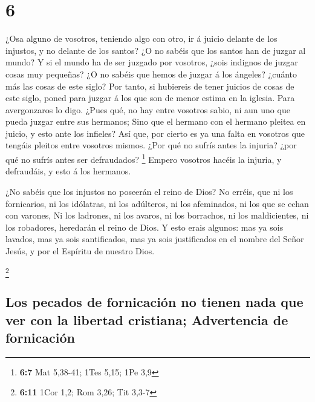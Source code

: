 \hypertarget{section-5}{%
\section{6}\label{section-5}}

 ¿Osa alguno de vosotros, teniendo algo con otro, ir á
juicio delante de los injustos, y no delante de los santos? 
¿O no sabéis que los santos han de juzgar al mundo? Y si el mundo ha de
ser juzgado por vosotros, ¿sois indignos de juzgar cosas muy pequeñas?
 ¿O no sabéis que hemos de juzgar á los ángeles? ¿cuánto más
las cosas de este siglo?  Por tanto, si hubiereis de tener
juicios de cosas de este siglo, poned para juzgar á los que son de menor
estima en la iglesia.  Para avergonzaros lo digo. ¿Pues qué,
no hay entre vosotros sabio, ni aun uno que pueda juzgar entre sus
hermanos;  Sino que el hermano con el hermano pleitea en
juicio, y esto ante los infieles?  Así que, por cierto es ya
una falta en vosotros que tengáis pleitos entre vosotros mismos. ¿Por
qué no sufrís antes la injuria? ¿por qué no sufrís antes ser
defraudados? \footnote{\textbf{6:7} Mat 5,38-41; 1Tes 5,15; 1Pe 3,9}
 Empero vosotros hacéis la injuria, y defraudáis, y esto á
los hermanos.

 ¿No sabéis que los injustos no poseerán el reino de Dios?
No erréis, que ni los fornicarios, ni los idólatras, ni los adúlteros,
ni los afeminados, ni los que se echan con varones,  Ni los
ladrones, ni los avaros, ni los borrachos, ni los maldicientes, ni los
robadores, heredarán el reino de Dios.  Y esto erais
algunos: mas ya sois lavados, mas ya sois santificados, mas ya sois
justificados en el nombre del Señor Jesús, y por el Espíritu de nuestro
Dios.

\footnote{\textbf{6:11} 1Cor 1,2; Rom 3,26; Tit 3,3-7}

\hypertarget{los-pecados-de-fornicaciuxf3n-no-tienen-nada-que-ver-con-la-libertad-cristiana-advertencia-de-fornicaciuxf3n}{%
\subsection{Los pecados de fornicación no tienen nada que ver con la
libertad cristiana; Advertencia de
fornicación}\label{los-pecados-de-fornicaciuxf3n-no-tienen-nada-que-ver-con-la-libertad-cristiana-advertencia-de-fornicaciuxf3n}}

